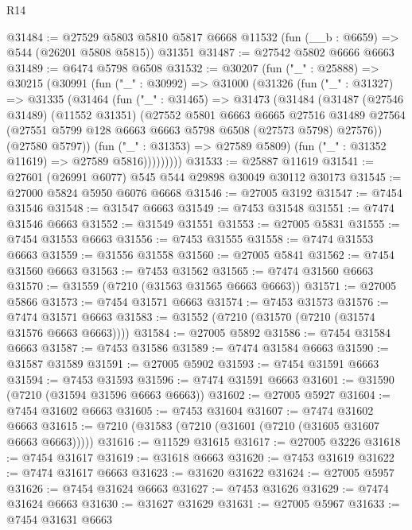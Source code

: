 \begin{lexlean}{R14}
\begin{coremodule}
@31484 := @27529
    @5803
    @5810
    @5817
    @6668
    @11532
    (fun (__b : @6659) => @544 (@26201 @5808 @5815))
    @31351
@31487 := @27542 @5802 @6666 @6663
@31489 := @6474 @5798 @6508
@31532 := @30207
    (fun ("_" : @25888) =>
    @30215
      (@30991
        (fun ("_" : @30992) =>
        @31000
          (@31326
            (fun ("_" : @31327) =>
            @31335
              (@31464
                (fun ("_" : @31465) =>
                @31473
                  (@31484
                    (@31487
                      (@27546 @31489)
                      (@11552 @31351)
                      (@27552
                        @5801
                        @6663
                        @6665
                        @27516
                        @31489
                        @27564
                        (@27551 @5799 @128 @6663 @6663 @5798 @6508 (@27573 @5798) @27576))
                      (@27580 @5797))
                    (fun ("_" : @31353) => @27589 @5809)
                    (fun ("_" : @31352 @11619) => @27589 @5816)))))))))
@31533 := @25887 @11619
@31541 := @27601 (@26991 @6077) @545 @544 @29898 @30049 @30112 @30173
@31545 := @27000 @5824 @5950 @6076 @6668
@31546 := @27005 @3192
@31547 := @7454 @31546
@31548 := @31547 @6663
@31549 := @7453 @31548
@31551 := @7474 @31546 @6663
@31552 := @31549 @31551
@31553 := @27005 @5831
@31555 := @7454 @31553 @6663
@31556 := @7453 @31555
@31558 := @7474 @31553 @6663
@31559 := @31556 @31558
@31560 := @27005 @5841
@31562 := @7454 @31560 @6663
@31563 := @7453 @31562
@31565 := @7474 @31560 @6663
@31570 := @31559 (@7210 (@31563 @31565 @6663 @6663))
@31571 := @27005 @5866
@31573 := @7454 @31571 @6663
@31574 := @7453 @31573
@31576 := @7474 @31571 @6663
@31583 := @31552 (@7210 (@31570 (@7210 (@31574 @31576 @6663 @6663))))
@31584 := @27005 @5892
@31586 := @7454 @31584 @6663
@31587 := @7453 @31586
@31589 := @7474 @31584 @6663
@31590 := @31587 @31589
@31591 := @27005 @5902
@31593 := @7454 @31591 @6663
@31594 := @7453 @31593
@31596 := @7474 @31591 @6663
@31601 := @31590 (@7210 (@31594 @31596 @6663 @6663))
@31602 := @27005 @5927
@31604 := @7454 @31602 @6663
@31605 := @7453 @31604
@31607 := @7474 @31602 @6663
@31615 := @7210 (@31583 (@7210 (@31601 (@7210 (@31605 @31607 @6663 @6663)))))
@31616 := @11529 @31615
@31617 := @27005 @3226
@31618 := @7454 @31617
@31619 := @31618 @6663
@31620 := @7453 @31619
@31622 := @7474 @31617 @6663
@31623 := @31620 @31622
@31624 := @27005 @5957
@31626 := @7454 @31624 @6663
@31627 := @7453 @31626
@31629 := @7474 @31624 @6663
@31630 := @31627 @31629
@31631 := @27005 @5967
@31633 := @7454 @31631 @6663

\end{coremodule}
\end{lexlean}
